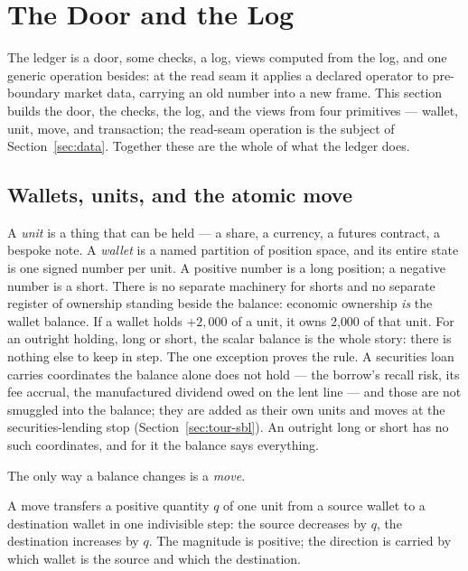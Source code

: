 \section{The Door and the Log}\label{sec:door}

The ledger is a door, some checks, a log, views computed from the log, and one
generic operation besides: at the read seam it applies a declared operator to
pre-boundary market data, carrying an old number into a new frame. This section
builds the door, the checks, the log, and the views from four primitives ---
wallet, unit, move, and transaction; the read-seam operation is the subject of
Section~\ref{sec:data}. Together these are the whole of what the ledger does.

\subsection{Wallets, units, and the atomic move}

A \emph{unit} is a thing that can be held --- a share, a currency, a futures
contract, a bespoke note. A \emph{wallet} is a named partition of position space,
and its entire state is one signed number per unit. A positive number is a long
position; a negative number is a short. There is no separate machinery for shorts
and no separate register of ownership standing beside the balance: economic
ownership \emph{is} the wallet balance. If a wallet holds $+2{,}000$ of a unit, it
owns 2{,}000 of that unit. For an outright holding, long or short, the scalar
balance is the whole story: there is nothing else to keep in step. The one
exception proves the rule. A securities loan carries coordinates the balance alone
does not hold --- the borrow's recall risk, its fee accrual, the manufactured
dividend owed on the lent line --- and those are not smuggled into the balance;
they are added as their own units and moves at the securities-lending stop
(Section~\ref{sec:tour-sbl}). An outright long or short has no such coordinates,
and for it the balance says everything.

The only way a balance changes is a \emph{move}.

\begin{definition}\label{def:move}
A move transfers a positive quantity $q$ of one unit from a source wallet to a
destination wallet in one indivisible step: the source decreases by $q$, the
destination increases by $q$. The magnitude is positive; the direction is carried
by which wallet is the source and which the destination.
\end{definition}

